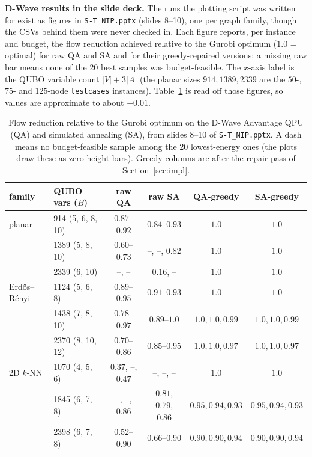 \documentclass[11pt]{article}
\newcommand{\code}[1]{\texttt{#1}}
\begin{document}
\textbf{D-Wave results in the slide deck.} The runs the plotting script was written for exist as figures in \code{S-T\_NIP.pptx} (slides 8--10), one per graph family, though the CSVs behind them were never checked in. Each figure reports, per instance and budget, the flow reduction achieved relative to the Gurobi optimum ($1.0$ = optimal) for raw QA and SA and for their greedy-repaired versions; a missing raw bar means none of the 20 best samples was budget-feasible. The $x$-axis label is the QUBO variable count $|V| + 3|A|$ (the planar sizes $914, 1389, 2339$ are the $50$-, $75$- and $125$-node \code{testcases} instances). Table~\ref{tab:dwave} is read off those figures, so values are approximate to about $\pm 0.01$.

\begin{table}[h]
\centering
\small
\begin{tabular}{llcccc}
\toprule
family & QUBO vars ($B$) & raw QA & raw SA & QA-greedy & SA-greedy \\
\midrule
planar & 914 (5, 6, 8, 10) & $0.87$--$0.92$ & $0.84$--$0.93$ & $1.0$ & $1.0$ \\
       & 1389 (5, 8, 10)   & $0.60$--$0.73$ & --, --, $0.82$ & $1.0$ & $1.0$ \\
       & 2339 (6, 10)      & --, --         & $0.16$, --     & $1.0$ & $1.0$ \\
\midrule
Erd\H{o}s--R\'enyi & 1124 (5, 6, 8) & $0.89$--$0.95$ & $0.91$--$0.93$ & $1.0$ & $1.0$ \\
       & 1438 (7, 8, 10)   & $0.78$--$0.97$ & $0.89$--$1.0$  & $1.0, 1.0, 0.99$ & $1.0, 1.0, 0.99$ \\
       & 2370 (8, 10, 12)  & $0.70$--$0.86$ & $0.85$--$0.95$ & $1.0, 1.0, 0.97$ & $1.0, 1.0, 0.97$ \\
\midrule
2D $k$-NN & 1070 (4, 5, 6) & $0.37$, --, $0.47$ & --, --, -- & $1.0$ & $1.0$ \\
       & 1845 (6, 7, 8)    & --, --, $0.86$ & $0.81$, $0.79$, $0.86$ & $0.95, 0.94, 0.93$ & $0.95, 0.94, 0.93$ \\
       & 2398 (6, 7, 8)    & $0.52$--$0.90$ & $0.66$--$0.90$ & $0.90, 0.90, 0.94$ & $0.90, 0.90, 0.94$ \\
\bottomrule
\end{tabular}
\caption{Flow reduction relative to the Gurobi optimum on the D-Wave Advantage QPU (QA) and simulated annealing (SA), from slides 8--10 of \code{S-T\_NIP.pptx}. A dash means no budget-feasible sample among the 20 lowest-energy ones (the plots draw these as zero-height bars). Greedy columns are after the repair pass of Section~\ref{sec:impl}.}
\label{tab:dwave}
\end{table}
\end{document}
